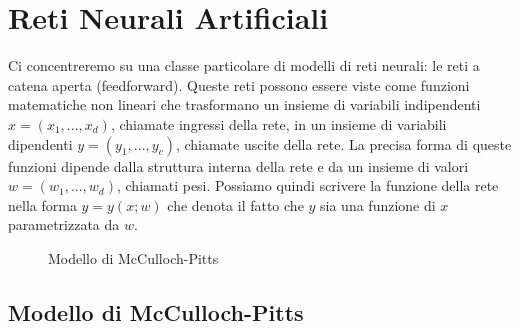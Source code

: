 \documentclass[11pt,a4paper,twoside,
openright]{book}
\newcommand{\addsymbol}{\draw[thick] (0.5em,0.5em) -- (0,0.5em) -- 
                        (0,-0.5em) --  (-0.5em,-0.5em)
                        (0em,0.75em) -- (0em,-0.75em)
                        (0.75em,0em) -- (-0.75em,0em);}
\begin{document}
\section{Reti Neurali Artificiali}
\label{section:retiartificiali}
Ci concentreremo su una classe particolare di modelli di reti neurali: le reti a catena aperta (feedforward). Queste reti possono essere viste come funzioni matematiche non lineari che trasformano un insieme di variabili indipendenti $x = (x_{1}, ... , x_{d})$, chiamate ingressi della rete, in un insieme di variabili dipendenti $y = (y_{1}, ... , y_{c})$, chiamate uscite della rete. La precisa forma di queste funzioni dipende dalla struttura interna della rete e da un insieme di valori $w = (w_{1}, ... , w_{d})$, chiamati pesi. Possiamo quindi scrivere la funzione della rete nella forma $y = y(x; w)$ che denota il fatto che $y$ sia una funzione di $x$ parametrizzata da $w$.

\begin{figure}[h!]
\begin{center}
\end{center}
\caption{Modello di McCulloch-Pitts}
\label{fig:mcpitts}
\end{figure}
\subsection*{Modello di McCulloch-Pitts}
\end{document}
